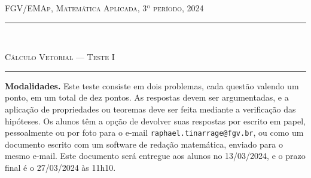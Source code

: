 \documentclass[11pt]{article}
\newcommand{\HRule}{\rule{\linewidth}{0.5mm}}
\begin{document}
\begin{center}
\Large{\textsc{FGV/EMAp, Matemática Aplicada, 3$^\text{o}$ período, 2024}}
\vspace{.25cm}

\HRule
\\\vspace{.25cm}

\LARGE{\textsc{Cálculo Vetorial --- Teste I}} 
\HRule
\end{center}
\vspace{.5cm}

\noindent\textbf{Modalidades}\textbf{.} 
Este teste consiste em dois problemas, cada questão valendo um ponto, em um total de dez pontos. As respostas devem ser argumentadas, e a aplicação de propriedades ou teoremas deve ser feita mediante a verificação das hipóteses. Os alunos têm a opção de devolver suas respostas por escrito em papel, pessoalmente ou por foto para o e-mail \texttt{raphael.tinarrage@fgv.br}, ou como um documento escrito com um software de redação matemática, enviado para o mesmo e-mail. 
Este documento será entregue aos alunos no 13/03/2024, e o prazo final é o 27/03/2024 às 11h10.
\vspace{.75cm}
\end{document}
